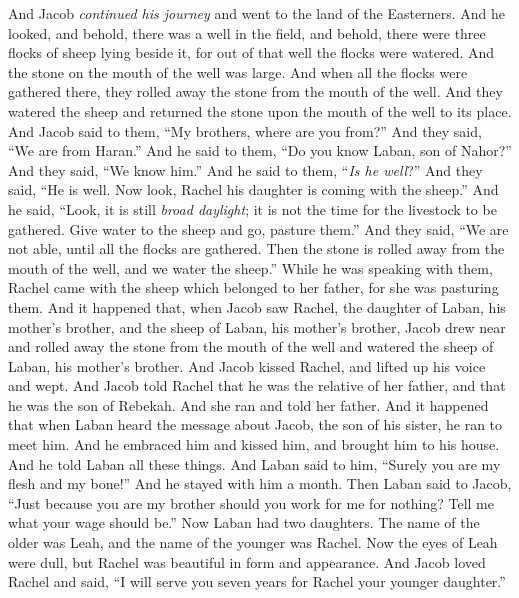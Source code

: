 \begin{biblechapter} %
 And Jacob \textit{continued his journey} and went to the land of the Easterners.
\verse And he looked, and behold, there was a well in the field, and behold, there were three flocks of sheep lying beside it, for out of that well the flocks were watered. And the stone on the mouth of the well was large.
\verse And when all the flocks were gathered there, they rolled away the stone from the mouth of the well. And they watered the sheep and returned the stone upon the mouth of the well to its place.
\verse And Jacob said to them, “My brothers, where are you from?” And they said, “We are from Haran.”
\verse And he said to them, “Do you know Laban, son of Nahor?” And they said, “We know him.”
\verse And he said to them, “\textit{Is he well}?” And they said, “He is well. Now look, Rachel his daughter is coming with the sheep.”
\verse And he said, “Look, it is still \textit{broad daylight}; it is not the time for the livestock to be gathered. Give water to the sheep and go, pasture them.”
\verse And they said, “We are not able, until all the flocks are gathered. Then the stone is rolled away from the mouth of the well, and we water the sheep.”
\verse While he was speaking with them, Rachel came with the sheep which belonged to her father, for she was pasturing them.
\verse And it happened that, when Jacob saw Rachel, the daughter of Laban, his mother’s brother, and the sheep of Laban, his mother’s brother, Jacob drew near and rolled away the stone from the mouth of the well and watered the sheep of Laban, his mother’s brother.
\verse And Jacob kissed Rachel, and lifted up his voice and wept.
\verse And Jacob told Rachel that he was the relative of her father, and that he was the son of Rebekah. And she ran and told her father.
\verse And it happened that when Laban heard the message about Jacob, the son of his sister, he ran to meet him. And he embraced him and kissed him, and brought him to his house. And he told Laban all these things.
\verse And Laban said to him, “Surely you are my flesh and my bone!” And he stayed with him a month.
 Then Laban said to Jacob, “Just because you are my brother should you work for me for nothing? Tell me what your wage should be.”
\verse Now Laban had two daughters. The name of the older was Leah, and the name of the younger was Rachel.
\verse Now the eyes of Leah were dull, but Rachel was beautiful in form and appearance.
\verse And Jacob loved Rachel and said, “I will serve you seven years for Rachel your younger daughter.”

\end{biblechapter}
